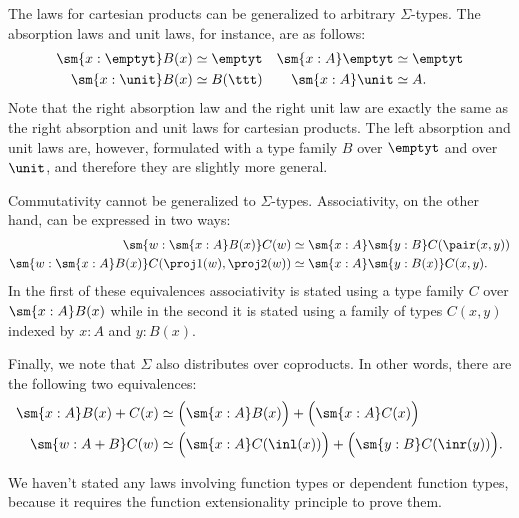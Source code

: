 \begin{eg}\label{eg:laws-Sigma-types}
  The laws for cartesian products can be generalized to arbitrary $\Sigma$-types. The absorption laws and unit laws, for instance, are as follows:
  \begin{align*}
    \sm{x:\emptyt}B(x) & \simeq \emptyt & \sm{x:A}\emptyt & \simeq \emptyt \\
    \sm{x:\unit}B(x) & \simeq B(\ttt) & \sm{x:A}\unit & \simeq A.
  \end{align*}
  Note that the right absorption law and the right unit law are exactly the same as the right absorption and unit laws for cartesian products. The left absorption and unit laws are, however, formulated with a type family $B$ over $\emptyt$ and over $\unit$, and therefore they are slightly more general.
  
  Commutativity cannot be generalized to $\Sigma$-types. Associativity, on the other hand, can be expressed in two ways:
  \begin{align*}
    \sm{w:\sm{x:A}B(x)}C(w) & \simeq\sm{x:A}\sm{y:B}C(\pair(x,y)) \\
    \sm{w:\sm{x:A}B(x)}C(\proj 1(w),\proj 2(w)) & \simeq \sm{x:A}\sm{y:B(x)}C(x,y). 
  \end{align*}
  In the first of these equivalences associativity is stated using a type family $C$ over $\sm{x:A}B(x)$ while in the second it is stated using a family of types $C(x,y)$ indexed by $x:A$ and $y:B(x)$.
  
  Finally, we note that $\Sigma$ also distributes over coproducts. In other words, there are the following two equivalences:
  \begin{align*}
    \sm{x:A}B(x)+C(x) & \simeq \Big(\sm{x:A}B(x)\Big)+\Big(\sm{x:A}C(x)\Big) \\
    \sm{w:A+B}C(w) & \simeq \Big(\sm{x:A}C(\inl(x))\Big)+\Big(\sm{y:B}C(\inr(y))\Big).
  \end{align*}
\end{eg}

\begin{rmk}
    We haven't stated any laws involving function types or dependent function types, because it requires the function extensionality principle to prove them.
\end{rmk}



